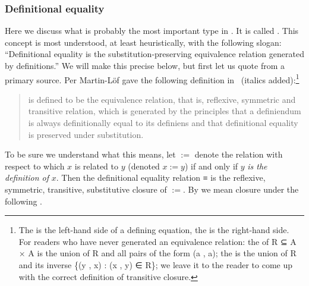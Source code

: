 \subsubsection{Definitional equality}\label{sec:defin-equal}
Here we discuss what is probably the most important type in \mltt. It is called . This concept is most understood, at least heuristically, with the following slogan: ``Definitional equality is the substitution-preserving equivalence relation generated by definitions.''
We will make this precise below, but first let us quote from a primary source. Per Martin-L\"of gave the following definition in~\cite[\S1.11]{MR0387009} (italics added):\footnote{The  is the left-hand side of a defining equation, the  is the right-hand side.\\ For readers who have never generated an equivalence relation: the  of \ab R \af ⊆ \ab A \ad × \ab A is the union of \ab R and all pairs of the form (\ab a , \ab a); the  is the union of \ab R and its inverse \{(\ab y , \ab x) : (\ab x , \ab y) ∈ \ab R\}; we leave it to the reader to come up with the correct definition of transitive closure.}
\begin{quote}
   is defined to be the equivalence relation, that is, reflexive, symmetric and transitive relation, which is generated by the principles that a definiendum is always definitionally equal to its definiens and that definitional equality is preserved under substitution.
\end{quote}
To be sure we understand what this means, let $:=$ denote the relation with respect to which $x$ is related to $y$ (denoted $x := y$) if and only if $y$ \emph{is the definition of} $x$.  Then the definitional equality relation \ad ≡ is the reflexive, symmetric, transitive, substitutive closure of $:=$. By  we mean closure under the following .
\vskip3mm\hskip1cm \\[-5pt]


